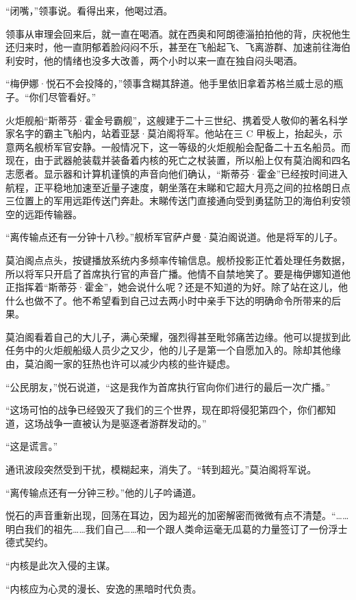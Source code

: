\documentclass[AutoFakeBold=true]{book}
\begin{document}
``闭嘴，''领事说。看得出来，他喝过酒。

领事从审理会回来后，就一直在喝酒。就在西奥和阿朗德淄拍拍他的背，庆祝他生还归来时，他一直阴郁着脸闷闷不乐，甚至在飞船起飞、飞离游群、加速前往海伯利安时，他的情绪也没多大改善，两个小时以来一直在独自闷头喝酒。

``梅伊娜·悦石不会投降的，''领事含糊其辞道。他手里依旧拿着苏格兰威士忌的瓶子。``你们尽管看好。''

\vspace*{1em}

火炬舰船``斯蒂芬·霍金号霸舰''，这艘建于二十三世纪、携着受人敬仰的著名科学家名字的霸主飞船内，站着亚瑟·莫泊阁将军。他站在三 C 甲板上，抬起头，示意两名舰桥军官安静。一般情况下，这一等级的火炬舰船会配备二十五名船员。而现在，由于武器舱装载并装备着内核的死亡之杖装置，所以船上仅有莫泊阁和四名志愿者。显示器和计算机谨慎的声音向他们确认，``斯蒂芬·霍金''已经按时间进入航程，正平稳地加速至近量子速度，朝坐落在末睇和它超大月亮之间的拉格朗日点三位置上的军用远距传送门奔赴。末睇传送门直接通向受到勇猛防卫的海伯利安领空的远距传输器。

``离传输点还有一分钟十八秒。''舰桥军官萨卢曼·莫泊阁说道。他是将军的儿子。

莫泊阁点点头，按键播放系统内多频率传输信息。舰桥投影正忙着处理任务数据，所以将军只开启了首席执行官的声音广播。他情不自禁地笑了。要是梅伊娜知道他正指挥着``斯蒂芬·霍金''，她会说什么呢？还是不知道的为好。除了站在这儿，他什么也做不了。他不希望看到自己过去两小时中亲手下达的明确命令所带来的后果。

莫泊阁看着自己的大儿子，满心荣耀，强烈得甚至毗邻痛苦边缘。他可以提拔到此任务中的火炬舰船级人员少之又少，他的儿子是第一个自愿加入的。除却其他缘由，莫泊阁一家的狂热也许可以减少内核的些许疑虑。

``公民朋友，''悦石说道，``这是我作为首席执行官向你们进行的最后一次广播。''

``这场可怕的战争已经毁灭了我们的三个世界，现在即将侵犯第四个，你们都知道，这场战争一直被认为是驱逐者游群发动的。''

``这是谎言。''

通讯波段突然受到干扰，模糊起来，消失了。``转到超光。''莫泊阁将军说。

``离传输点还有一分钟三秒。''他的儿子吟诵道。

悦石的声音重新出现，回荡在耳边，因为超光的加密解密而微微有点不清楚。``……明白我们的祖先……我们自己……和一个跟人类命运毫无瓜葛的力量签订了一份浮士德式契约。

``内核是此次入侵的主谋。

``内核应为心灵的漫长、安逸的黑暗时代负责。
\end{document}
